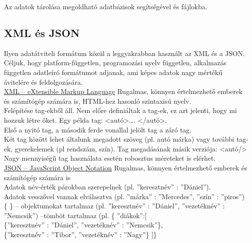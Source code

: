 
Az adatok tárolása megoldható adatbázisok segítségével és fájlokba.

\subsection{XML és JSON}
 Ilyen adatátviteli formátum közül a leggyakrabban használt az XML és a JSON. Céljuk, hogy platform-független, programozási nyelv független, alkalmazás független adatleíró formátumot adjanak, ami képes adatok nagy mértékű ávitelére és feldolgozására.
\newline
\\ \underline{XML – eXtensible Markup Language}
\vspace{10pt}
\newline \noindent Rugalmas, könnyen értelmezhető emberek és számítógép számára is, HTML-hez hasonló szintaxisú nyelv. 
\vspace{5pt}\\Felépítése tag-ekből áll. Nem előre definiáltak a tag-ek, ez azt jelenti, hogy mi hozzuk létre őket. Egy példa tag: <autó>…. </autó>.
\vspace{5pt}\\Első a nyitó tag, a második ferde vonallal jelölt tag a záró tag.
\\Két tag között lehet általunk megadott szöveg (pl. autó márka) vagy további tag-ek, gyerekelemek (pl rendszám, szín). Tag megadásának másik verziója: <autó/>
\vspace{5pt}\\Nagy mennyiségű tag használata esetén robosztus méreteket is elérhet.
\newline
\\ \underline{JSON – JavaScript Object Notation}
\vspace{10pt}
\newline \noindent Rugalmas, könnyen értelmezhető emberek és számítógép számára is
\\ Adatok név-érték párokban szerepelnek (pl. ”keresztnév” : ”Dániel”).
\\ Adatok vesszővel vannak elválasztva (pl. ”márka” : ”Mercedes”, ”szín” : ”piros”)
\\ \{ \} – objektumokat tartalmaz (pl. {”keresztnév” : ”Dániel”, ”vezetéknév” : ”Nemcsik”})
\newline [ ] –tömböt tartalmaz (pl. \{ ”diákok”:[
\\  \indent	\{”keresztnév” : ”Dániel”, ”vezetéknév” : ”Nemcsik”\},
\\  \indent \{”keresztnév” : ”Tibor”, ”vezetéknév” : ”Nagy”\}
]\}

